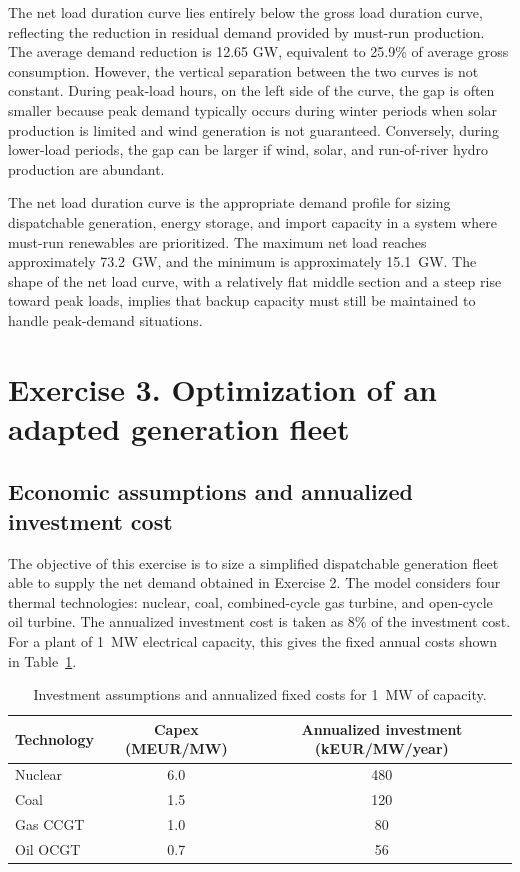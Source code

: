 \documentclass[a4paper]{report}
\begin{document}
The net load duration curve lies entirely below the gross load duration curve, reflecting the reduction in residual demand provided by must-run production. The average demand reduction is 12.65 GW, equivalent to 25.9\% of average gross consumption. However, the vertical separation between the two curves is not constant. During peak-load hours, on the left side of the curve, the gap is often smaller because peak demand typically occurs during winter periods when solar production is limited and wind generation is not guaranteed. Conversely, during lower-load periods, the gap can be larger if wind, solar, and run-of-river hydro production are abundant.

The net load duration curve is the appropriate demand profile for sizing dispatchable generation, energy storage, and import capacity in a system where must-run renewables are prioritized. The maximum net load reaches approximately \SI{73.2}{\giga\watt}, and the minimum is approximately \SI{15.1}{\giga\watt}. The shape of the net load curve, with a relatively flat middle section and a steep rise toward peak loads, implies that backup capacity must still be maintained to handle peak-demand situations.

\section{Exercise 3. Optimization of an adapted generation fleet}

\subsection{Economic assumptions and annualized investment cost}

The objective of this exercise is to size a simplified dispatchable generation fleet able to supply the net demand obtained in Exercise 2. The model considers four thermal technologies: nuclear, coal, combined-cycle gas turbine, and open-cycle oil turbine. The annualized investment cost is taken as 8\% of the investment cost. For a plant of \SI{1}{\mega\watt} electrical capacity, this gives the fixed annual costs shown in Table~\ref{tab:exercise3-investment}.

\begin{table}[H]
  \centering
  \caption{Investment assumptions and annualized fixed costs for \SI{1}{\mega\watt} of capacity.}
  \label{tab:exercise3-investment}
  \begin{tabular}{lcc}
    \toprule
    Technology & Capex (MEUR/MW) & Annualized investment (kEUR/MW/year) \\
    \midrule
    Nuclear & 6.0 & 480 \\
    Coal & 1.5 & 120 \\
    Gas CCGT & 1.0 & 80 \\
    Oil OCGT & 0.7 & 56 \\
    \bottomrule
  \end{tabular}
\end{table}
\end{document}
